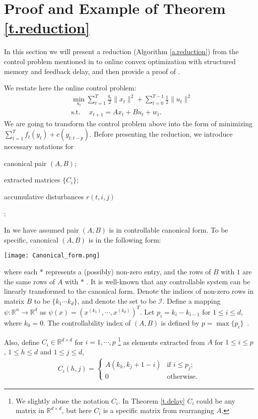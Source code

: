 \section{Proof and Example of Theorem \ref{t.reduction}}\label{appendix.reduction1}

In this section we will present a reduction (Algorithm \ref{a.reduction}) from the control problem mentioned in  to online convex optimization with structured memory and feedback delay, and then provide a proof of .

We restate here the online control problem:\begin{align*}
    &\min_{u_t}\sum_{t=1}^{T} \frac{q_t}{2}\|x_t\|^2 + \sum_{t=0}^{T-1}\frac{1}{2}\|u_t\|^2 \\
    &\mathrm{s.t.~}\quad x_{t+1}=Ax_t+Bu_t+w_t.
\end{align*}    
We are going to transform the control problem above into the form of minimizing $\sum_{t=1}^Tf_t(y_t)+c(y_{t:t-p})$. Before presenting the reduction, we introduce necessary notations for \begin{enumerate*}[label=(\arabic*)]
    \item canonical pair $(A,B)$; \item extracted matrices $\{C_i\}$; \item accumulative disturbances $r(t,i,j)$
\end{enumerate*}:

In  we have assumed pair $(A,B)$ is in controllable canonical form. To be specific, canonical $(A,B)$ is in the following form:
\begin{center}
    \texttt{[image: Canonical\_form.png]}
\end{center}
where each $*$ represents a (possibly) non-zero entry, and the rows of $B$ with $1$ are the same rows of $A$ with $*$ \citep{luenberger1967canonical,li2019online}. It is well-known that any controllable system can be linearly transformed to the canonical form. Denote the indices of non-zero rows in matrix $B$ to be $\{k_1\cdots k_d\}$, and denote the set to be $\mathcal{I}$. Define a mapping $\psi:\mathbb{R}^n\to\mathbb{R}^d$ as $\psi(x)=\left(x^{(k_1)},\cdots,x^{(k_d)}\right)^T.$
Let $p_i=k_i-k_{i-1}$ for $1\le i\le d$, where $k_0=0$. The controllability index of $(A,B)$ is defined by $p=\max\{p_i\}$~\citep{li2019online}. 

Also, define $C_i\in\mathbb{R}^{d\times d}$ for $i=1,\cdots,p$ \footnote{We slightly abuse the notation $C_i$.  In Theorem \ref{t.delay} $C_i$ could be any matrix in $\mathbb{R}^{d\times d}$, but here $C_i$ is a specific matrix from rearranging $A$.}
as elements extracted from $A$ for $1\le i\le p$, $1\le h\le d$ and $1\le j\le d$, %
\begin{align}\label{def.Ci}
    C_i(h,j)=
\begin{cases}
A(k_h,k_j+1-i) & \text{if $i\le p_j$};\\
0 & \text{otherwise}.
\end{cases}
\end{align}

